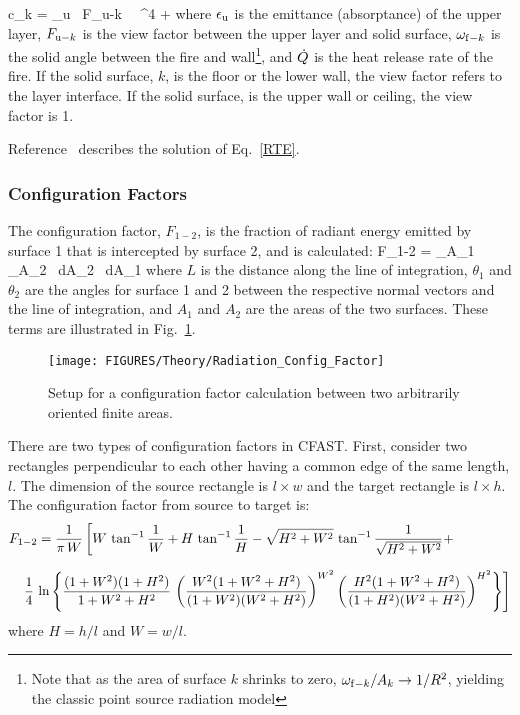 \be
   c_k = \epsilon_{\rm u} \, F_{{\rm u}-k} \, \sigma \, \Tu^4 +    \label{ckeq}
\ee
where $\epsilon_{\rm u}$ is the emittance (absorptance) of the upper layer, $F_{{\rm u}-k}$ is the view factor between the upper layer and solid surface, $\omega_{{\rm f}-k}$ is the solid angle between the fire and wall\footnote{Note that as the area of surface $k$ shrinks to zero, $\omega_{{\rm f}-k}/A_k \to 1/R^2$, yielding the classic point source radiation model}, and $\dot{Q}$ is the heat release rate of the fire. If the solid surface, $k$, is the floor or the lower wall, the view factor refers to the layer interface. If the solid surface, is the upper wall or ceiling, the view factor is 1.

Reference~\cite{Forney_radiation} describes the solution of Eq.~\ref{RTE}.


\subsubsection{Configuration Factors}

The configuration factor, $F_{1-2}$, is the fraction of radiant energy emitted by surface 1 that is intercepted by  surface 2, and is calculated:
\be
   F_{1-2} =  \int_{A_1} \int_{A_2}  \, dA_2 \, dA_1 \label{eq:config_factor}
\ee
where $L$ is the distance along the line of integration,  $\theta_1$ and $\theta_2$ are the angles for surface 1 and 2 between the respective normal vectors and the line of integration, and $A_1$ and $A_2$ are the areas of the two surfaces.  These terms are illustrated in Fig.~\ref{fig:Rad_Config_Factor}.
\begin{figure}
\begin{center}
\texttt{[image: FIGURES/Theory/Radiation\_Config\_Factor]}\\
\end{center}
\caption{Setup for a configuration factor calculation between two arbitrarily oriented finite areas.}
 \label{fig:Rad_Config_Factor}
\end{figure}
There are two types of configuration factors in CFAST. First, consider two rectangles perpendicular to each other having a common edge of the same length, $l$. The dimension of the source rectangle is $l \times w$ and the target rectangle is $l \times h$. The configuration factor from source to target is:
\begin{eqnarray}
\lefteqn{F_{1-2} = \frac{1}{\pi \, W} \left[ W \, \tan^{-1} \frac{1}{W} + H \, \tan^{-1} \frac{1}{H} - \sqrt{H^2+W^2} \, \tan^{-1} \frac{1}{\sqrt{H^2+W^2}} + \right.}  \nonumber \\[.1in]
& &   \left. \frac{1}{4} \, \ln \left\{ \frac{(1+W^2)(1+H^2)}{1+W^2+H^2} \, \left( \frac{W^2(1+W^2+H^2)}{(1+W^2)(W^2+H^2)} \right)^{W^2} \left( \frac{H^2(1+W^2+H^2)}{(1+H^2)(W^2+H^2)} \right)^{H^2} \right\} \right]
\end{eqnarray}
where $H=h/l$ and $W=w/l$.

